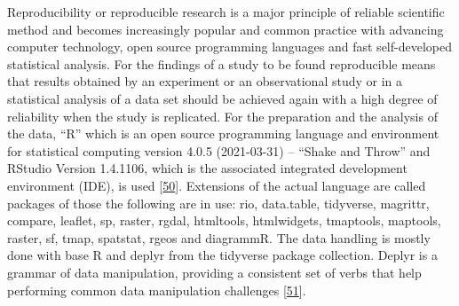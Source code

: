 \documentclass[a4paper,11pt]{article}
\begin{document}
Reproducibility or reproducible research is a major principle of reliable scientific method and becomes increasingly popular and common practice with advancing computer technology, open source programming languages and fast self-developed statistical analysis. For the findings of a study to be found reproducible means that results obtained by an experiment or an observational study or in a statistical analysis of a data set should be achieved again with a high degree of reliability when the study is replicated. For the preparation and the analysis of the data, ``R'' which is an open source programming language and environment for statistical computing version 4.0.5 (2021-03-31) -- ``Shake and Throw'' and RStudio Version 1.4.1106, which is the associated integrated development environment (IDE), is used {[}\protect\hyperlink{ref-R}{50}{]}. Extensions of the actual language are called packages of those the following are in use: rio, data.table, tidyverse, magrittr, compare, leaflet, sp, raster, rgdal, htmltools, htmlwidgets, tmaptools, maptools, raster, sf, tmap, spatstat, rgeos and diagrammR. The data handling is mostly done with base R and deplyr from the tidyverse package collection. Deplyr is a grammar of data manipulation, providing a consistent set of verbs that help performing common data manipulation challenges {[}\protect\hyperlink{ref-HadleyWickham.2021}{51}{]}.
\end{document}
